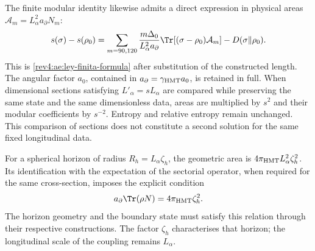 The finite modular identity likewise admits a direct expression
in physical areas \(\mathcal A_m=L_\alpha^2a_\partial N_m\):
\begin{equation}
 s(\sigma)-s(\rho_0)
 =\sum_{m=90,120}\frac{m\Delta_0}{L_\alpha^2a_\partial}
   \Tr[(\sigma-\rho_0)\mathcal A_m]
  -D(\sigma\Vert\rho_0).
 \label{rev5:modular-fisica}
\end{equation}
This is \eqref{rev4:ae:ley-finita-formula} after substitution
of the constructed length. The angular factor \(a_0\), contained
in \(a_\partial=\gamma_{\rm HMT}a_0\), is retained in full.
When dimensional sections satisfying \(L'_\alpha=sL_\alpha\)
are compared while preserving the same state and the same
dimensionless data, areas are multiplied by \(s^2\) and their
modular coefficients by \(s^{-2}\). Entropy and relative entropy
remain unchanged. This comparison of sections does not constitute
a second solution for the same fixed longitudinal data.

For a spherical horizon of radius \(R_h=L_\alpha\zeta_h\),
the geometric area is \(4\pi_{\rm HMT}L_\alpha^2\zeta_h^2\).
Its identification with the expectation of the sectorial operator,
when required for the same cross-section, imposes the explicit
condition
\[
 a_\partial\Tr(\rho N)=4\pi_{\rm HMT}\zeta_h^2.
\]
The horizon geometry and the boundary state must satisfy this
relation through their respective constructions. The factor
\(\zeta_h\) characterises that horizon; the longitudinal scale
of the coupling remains \(L_\alpha\).
